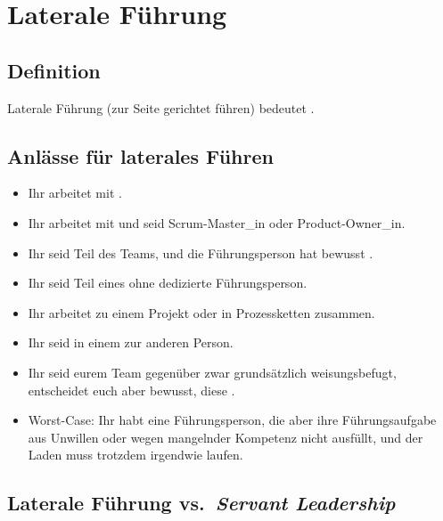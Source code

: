 \section{Laterale Führung}
\label{laterale-führung}


\subsection{Definition}

Laterale Führung (\glqq zur Seite gerichtet führen\grqq) bedeutet .~\cite{kuhl-laterales-fuehren, fuehren-ohne-fuehrung, gtd-when-not-in-charge}

\subsection{Anlässe für laterales Führen}

\begin{itemize}
  \item Ihr arbeitet mit .
  \item Ihr arbeitet mit  und seid Scrum-Master\_in oder Product-Owner\_in.
  \item Ihr seid Teil des Teams, und die Führungsperson hat bewusst .
  \item Ihr seid Teil eines  ohne dedizierte Führungsperson.
  \item Ihr arbeitet  zu einem Projekt oder in Prozessketten zusammen.
  \item Ihr seid in einem  zur anderen Person.
  \item Ihr seid eurem Team gegenüber zwar grundsätzlich weisungsbefugt, entscheidet euch aber bewusst, diese .
  \item Worst-Case: Ihr habt eine Führungsperson, die aber ihre Führungsaufgabe aus Unwillen oder wegen mangelnder Kompetenz nicht ausfüllt, und der Laden muss trotzdem irgendwie laufen.
\end{itemize}


\subsection{Laterale Führung vs.~\emph{Servant Leadership}}

